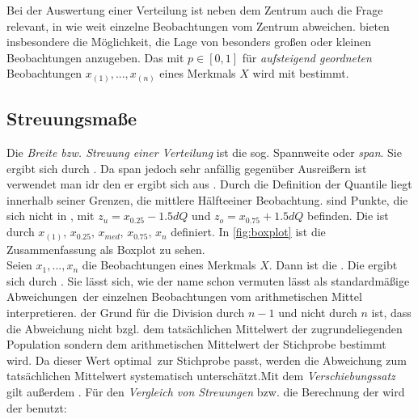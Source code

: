 Bei der Auswertung einer Verteilung ist neben dem Zentrum auch die Frage relevant, in wie weit einzelne Beobachtungen vom Zentrum abweichen.  bieten insbesondere die Möglichkeit, die Lage von besonders großen oder kleinen Beobachtungen anzugeben. Das  mit $p \in [0, 1]$ für \emph{aufsteigend geordneten} Beobachtungen $x_{(1)}, ..., x_{(n)}$ eines Merkmals $X$ wird mit  bestimmt.
    
\subsection{Streuungsmaße}
Die \emph{Breite \emph{bzw.} Streuung einer Verteilung} ist die sog. Spannweite oder \emph{span}. Sie ergibt sich durch . Da span jedoch sehr anfällig gegenüber Ausreißern ist verwendet man idr den  er ergibt sich aus . Durch die Definition der Quantile liegt innerhalb seiner Grenzen, die \glqq mittlere Hälfte\grqq einer Beobachtung.  sind Punkte, die sich nicht in \hlcm{$[z_u, z_o]$}, mit $z_u = x_{0.25} - 1.5dQ$ und $z_o = x_{0.75} + 1.5dQ$ befinden. Die  ist durch $x_{(1)}\text{, }x_{0.25}\text{, }x_{med}\text{, }x_{0.75}\text{, }x_{n}$ definiert. In \cref{fig:boxplot} ist die Zusammenfassung als Boxplot zu sehen.\linebreak\\
Seien $x_1, ..., x_n$ die Beobachtungen eines Merkmals $X$. Dann ist die  . Die  ergibt sich durch . Sie lässt sich, wie der name schon vermuten lässt als \glqq standardmäßige Abweichungen\grqq\, der einzelnen Beobachtungen vom arithmetischen Mittel interpretieren. der Grund für die Division durch \emph{$n-1$} und nicht durch \emph{$n$} ist, dass die Abweichung nicht bzgl. dem tatsächlichen Mittelwert der zugrundeliegenden Population sondern dem arithmetischen Mittelwert der Stichprobe bestimmt wird. Da dieser Wert \glqq optimal\grqq\, zur Stichprobe passt, werden die Abweichung zum tatsächlichen Mittelwert systematisch unterschätzt.Mit dem \emph{Verschiebungssatz} gilt außerdem . Für den \emph{Vergleich von Streuungen} bzw. die Berechnung der  wird der  benutzt: 
